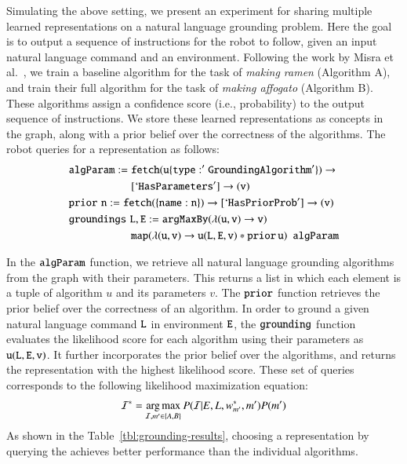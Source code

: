 Simulating the above setting, we present an experiment for sharing multiple learned representations on a natural language grounding problem. Here the goal is  to output a sequence of instructions for the robot to follow, given an input natural language command and an environment.
Following the work by Misra et al.~\citep{misra2014tell}, we train a baseline algorithm for the task of \textit{making ramen} (Algorithm A), and train their full algorithm for the task of \textit{making affogato} (Algorithm B). These algorithms assign a  confidence score (i.e., probability) to the output sequence of instructions.  We store these learned representations as concepts in the \robobrain{} graph, along with a prior belief over the correctness of the algorithms. The robot queries \robobrain{} for a representation as follows:
{\small
\begin{align*}
& {\tt algParam  :=  fetch (u\{type:'GroundingAlgorithm'\})}\rightarrow \\
& {\tt \hspace*{2cm} [`HasParameters'] \rightarrow (v)}   \\
& {\tt prior \,\, n :=  fetch (\{name:n\})\rightarrow [`HasPriorProb'] \rightarrow (v)}\\
& {\tt groundings \,\, L,E :=   argMaxBy(\lambda(u,v)\rightarrow v)} \\
& {\tt \hspace*{2cm} map(\lambda(u,v) \rightarrow u(L,E,v)*prior\, u) \, \, \, algParam}
\end{align*}
}

\medskip
In the ${\tt algParam}$ function, we retrieve all natural language grounding algorithms from the \robobrain{} graph with their parameters. This returns a list in which each element is a tuple of algorithm $u$ and its parameters $v$. The ${\tt prior}$ function retrieves the prior belief over the correctness of an algorithm. In order to ground a given natural language command ${\tt L}$ in environment ${\tt E}$, the ${\tt grounding}$ function evaluates the likelihood score for each algorithm  using their parameters as ${\tt u(L,E,v)}$. It further incorporates the prior belief over the algorithms, and returns the representation with the highest likelihood score. These set of queries corresponds to the following likelihood maximization equation:
\begin{equation*}
\mathcal{I}^*  = \operatorname*{arg\,max}_{\mathcal{I},m'\in \{A,B\}} P(\mathcal{I}|E, L,  w_{m'}^* ,m')P(m')
\end{equation*}
As shown in the Table~\ref{tbl:grounding-results}, choosing a representation by querying the \robobrain{} achieves better performance than the individual algorithms.

